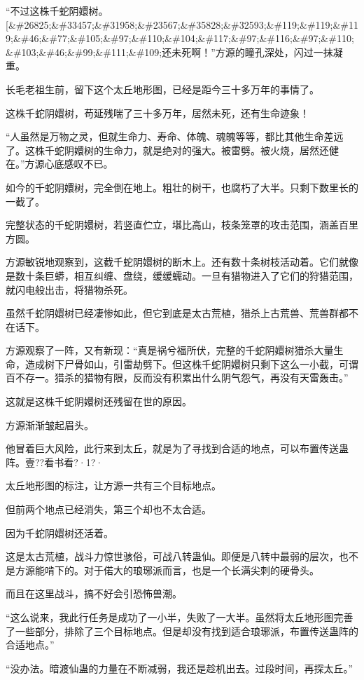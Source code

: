 \begin{this_body}
“不过这株千蛇阴嬛树。[\&\#26825;\&\#33457;\&\#31958;\&\#23567;\&\#35828;\&\#32593;\&\#119;\&\#119;\&\#119;\&\#46;\&\#77;\&\#105;\&\#97;\&\#110;\&\#104;\&\#117;\&\#97;\&\#116;\&\#97;\&\#110;\&\#103;\&\#46;\&\#99;\&\#111;\&\#109;还未死啊！”方源的瞳孔深处，闪过一抹凝重。

长毛老祖生前，留下这个太丘地形图，已经是距今三十多万年的事情了。

这株千蛇阴嬛树，苟延残喘了三十多万年，居然未死，还有生命迹象！

“人虽然是万物之灵，但就生命力、寿命、体魄、魂魄等等，都比其他生命差远了。这株千蛇阴嬛树的生命力，就是绝对的强大。被雷劈。被火烧，居然还健在。”方源心底感叹不已。

如今的千蛇阴嬛树，完全倒在地上。粗壮的树干，也腐朽了大半。只剩下数里长的一截了。

完整状态的千蛇阴嬛树，若竖直伫立，堪比高山，枝条笼罩的攻击范围，涵盖百里方圆。

方源敏锐地观察到，这截千蛇阴嬛树的断木上。还有数十条树枝活动着。它们就像是数十条巨蟒，相互纠缠、盘绕，缓缓蠕动。一旦有猎物进入了它们的狩猎范围，就闪电般出击，将猎物杀死。

虽然千蛇阴嬛树已经凄惨如此，但它到底是太古荒植，猎杀上古荒兽、荒兽群都不在话下。

方源观察了一阵，又有新现：“真是祸兮福所伏，完整的千蛇阴嬛树猎杀大量生命，造成树下尸骨如山，引雷劫劈下。但这株千蛇阴嬛树只剩下这么一小截，可谓百不存一。猎杀的猎物有限，反而没有积累出什么阴气怨气，再没有天雷轰击。”

这就是这株千蛇阴嬛树还残留在世的原因。

方源渐渐皱起眉头。

他冒着巨大风险，此行来到太丘，就是为了寻找到合适的地点，可以布置传送蛊阵。壹??看书看?·1?·

太丘地形图的标注，让方源一共有三个目标地点。

但前两个地点已经消失，第三个却也不太合适。

因为千蛇阴嬛树还活着。

这是太古荒植，战斗力惊世骇俗，可战八转蛊仙。即便是八转中最弱的层次，也不是方源能啃下的。对于偌大的琅琊派而言，也是一个长满尖刺的硬骨头。

而且在这里战斗，搞不好会引恐怖兽潮。

“这么说来，我此行任务是成功了一小半，失败了一大半。虽然将太丘地形图完善了一些部分，排除了三个目标地点。但是却没有找到适合琅琊派，布置传送蛊阵的合适地点。”

“没办法。暗渡仙蛊的力量在不断减弱，我还是趁机出去。过段时间，再探太丘。”


\end{this_body}
